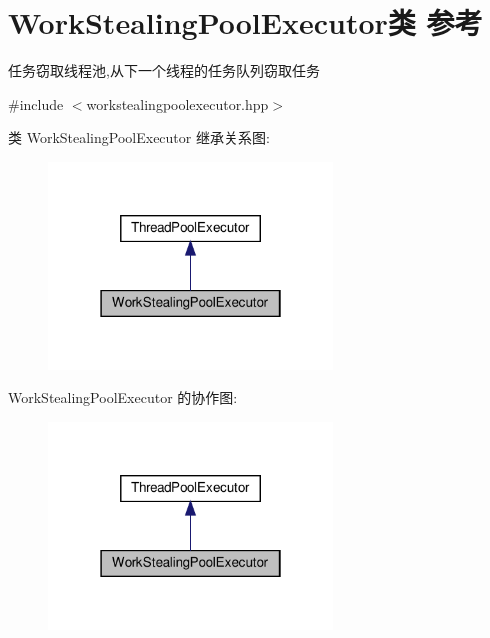 \hypertarget{classWorkStealingPoolExecutor}{}\section{Work\+Stealing\+Pool\+Executor类 参考}
\label{classWorkStealingPoolExecutor}


任务窃取线程池,从下一个线程的任务队列窃取任务  




{\ttfamily \#include $<$workstealingpoolexecutor.\+hpp$>$}



类 Work\+Stealing\+Pool\+Executor 继承关系图\+:\nopagebreak
\begin{figure}[H]
\begin{center}
\leavevmode
\includegraphics[width=214pt]{classWorkStealingPoolExecutor__inherit__graph}
\end{center}
\end{figure}


Work\+Stealing\+Pool\+Executor 的协作图\+:\nopagebreak
\begin{figure}[H]
\begin{center}
\leavevmode
\includegraphics[width=214pt]{classWorkStealingPoolExecutor__coll__graph}
\end{center}
\end{figure}
